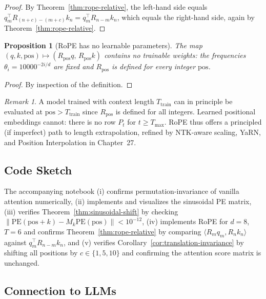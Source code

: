 \documentclass[11pt]{article}
\newtheorem{proposition}[theorem]{Proposition}
\theoremstyle{remark}
\newtheorem{remark}[theorem]{Remark}
\begin{document}
\begin{proof}
By Theorem~\ref{thm:rope-relative}, the left-hand side equals $q_m^{\top} R_{(n+c)-(m+c)} k_n = q_m^{\top} R_{n-m} k_n$, which equals the right-hand side, again by Theorem~\ref{thm:rope-relative}.
\end{proof}

\begin{proposition}[RoPE has no learnable parameters]
The map $(q, k, \mathrm{pos}) \mapsto (R_{\mathrm{pos}} q,\, R_{\mathrm{pos}} k)$ contains no trainable weights: the frequencies $\theta_i = 10000^{-2i/d}$ are fixed and $R_{\mathrm{pos}}$ is defined for every integer $\mathrm{pos}$.
\end{proposition}

\begin{proof}
By inspection of the definition.
\end{proof}

\begin{remark}
A model trained with context length $T_{\mathrm{train}}$ can in principle be evaluated at $\mathrm{pos} > T_{\mathrm{train}}$ since $R_{\mathrm{pos}}$ is defined for all integers. Learned positional embeddings cannot: there is no row $P_t$ for $t \geq T_{\max}$. RoPE thus offers a principled (if imperfect) path to length extrapolation, refined by NTK-aware scaling, YaRN, and Position Interpolation in Chapter~27.
\end{remark}

\subsection*{Code Sketch}

The accompanying notebook (i) confirms permutation-invariance of vanilla attention numerically, (ii) implements and visualizes the sinusoidal PE matrix, (iii) verifies Theorem~\ref{thm:sinusoidal-shift} by checking $\|\mathrm{PE}(\mathrm{pos}+k) - M_k \mathrm{PE}(\mathrm{pos})\| < 10^{-12}$, (iv) implements RoPE for $d=8$, $T=6$ and confirms Theorem~\ref{thm:rope-relative} by comparing $\langle R_m q_m, R_n k_n \rangle$ against $q_m^{\top} R_{n-m} k_n$, and (v) verifies Corollary~\ref{cor:translation-invariance} by shifting all positions by $c \in \{1, 5, 10\}$ and confirming the attention score matrix is unchanged.

\subsection*{Connection to LLMs}
\end{document}
